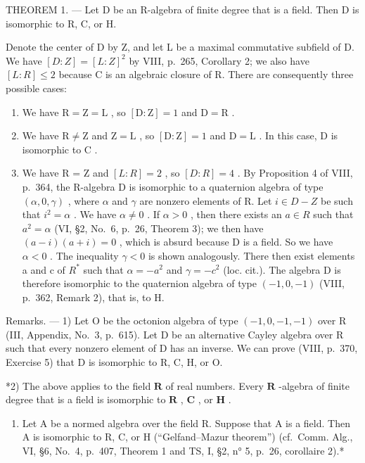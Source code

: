 THEOREM 1. --- Let D be an R-algebra of finite degree that is a field. Then D is isomorphic to R, C, or H.

Denote the center of D by Z, and let L be a maximal commutative subfield of D. We have \([D:Z]=[L:Z]^{2}\) by VIII, p.~265, Corollary 2; we also have \([L:R]\leqslant2\) because C is an algebraic closure of R. There are consequently three possible cases:

\begin{enumerate}
\def\labelenumi{\alph{enumi})}
\item
  We have \(\mathrm{R} = \mathrm{Z} = \mathrm{L}\) , so \([\mathrm{D}:\mathrm{Z}] = 1\) and \(\mathrm{D} = \mathrm{R}\) .
\item
  We have \(\mathrm{R} \neq \mathrm{Z}\) and \(\mathrm{Z} = \mathrm{L}\) , so \([\mathrm{D} : \mathrm{Z}] = 1\) and \(\mathrm{D} = \mathrm{L}\) . In this case, \(\mathrm{D}\) is isomorphic to \(\mathrm{C}\) .
\item
  We have R = Z and \([L : R] = 2\) , so \([D : R] = 4\) . By Proposition 4 of VIII, p.~364, the R-algebra D is isomorphic to a quaternion algebra of type \((\alpha, 0, \gamma)\) , where \(\alpha\) and \(\gamma\) are nonzero elements of R. Let \(i \in D - Z\) be such that \(i^{2} = \alpha\) . We have \(\alpha \neq 0\) . If \(\alpha > 0\) , then there exists an \(a \in R\) such that \(a^{2} = \alpha\) (VI, §2, No.~6, p.~26, Theorem 3); we then have \((a - i)(a + i) = 0\) , which is absurd because D is a field. So we have \(\alpha < 0\) . The inequality \(\gamma < 0\) is shown analogously. There then exist elements a and c of \(R^{*}\) such that \(\alpha = -a^{2}\) and \(\gamma = -c^{2}\) (loc. cit.). The algebra D is therefore isomorphic to the quaternion algebra of type \((-1,0,-1)\) (VIII, p.~362, Remark 2), that is, to H.
\end{enumerate}

Remarks. --- 1) Let O be the octonion algebra of type \((-1,0,-1,-1)\) over R (III, Appendix, No.~3, p.~615). Let D be an alternative Cayley algebra over R such that every nonzero element of D has an inverse. We can prove (VIII, p.~370, Exercise 5) that D is isomorphic to R, C, H, or O.

*2) The above applies to the field \(\mathbf{R}\) of real numbers. Every \(\mathbf{R}\) -algebra of finite degree that is a field is isomorphic to \(\mathbf{R}\) , \(\mathbf{C}\) , or \(\mathbf{H}\) .

\begin{enumerate}
\def\labelenumi{\arabic{enumi})}
\setcounter{enumi}{2}
\tightlist
\item
  Let A be a normed algebra over the field R. Suppose that A is a field. Then A is isomorphic to R, C, or H (``Gelfand--Mazur theorem'') (cf.~Comm. Alg., VI, §6, No.~4, p.~407, Theorem 1 and TS, I, §2, n° 5, p.~26, corollaire 2).*
\end{enumerate}

